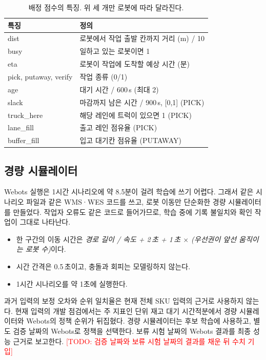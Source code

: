 \documentclass[conference]{IEEEtran}
\newcommand{\todo}[1]{\textcolor{red}{[TODO: #1]}}
\begin{document}
\begin{table}[t]
\centering
\caption{배정 점수의 특징. 위 세 개만 로봇에 따라 달라진다.} %
\label{tab:features}
\small
\begin{tabular}{@{}lp{}@{}}
\toprule
특징 & 정의 \\
\midrule
dist & 로봇에서 작업 출발 칸까지 거리 (m) / 10 \\
busy & 일하고 있는 로봇이면 1 \\
eta & 로봇이 작업에 도착할 예상 시간 (분) \\
\midrule
pick, putaway, verify & 작업 종류 (0/1) \\
age & 대기 시간 / 600\,s (최대 2) \\
slack & 마감까지 남은 시간 / 900\,s, [0,1] (PICK) \\
truck\_here & 해당 레인에 트럭이 있으면 1 (PICK) \\
lane\_fill & 출고 레인 점유율 (PICK) \\
buffer\_fill & 입고 대기칸 점유율 (PUTAWAY) \\
\bottomrule
\end{tabular}
\end{table}

\subsection{경량 시뮬레이터}
Webots 실행은 1시간 시나리오에 약 8.5분이 걸려 학습에 쓰기 어렵다.
그래서 같은 시나리오 파일과 같은 WMS·WES 코드를 쓰고, 로봇 이동만 단순화한 경량 시뮬레이터를 만들었다.
작업자 오류도 같은 코드로 들어가므로, 학습 중에 기록 불일치와 확인 작업이 그대로 나타난다.
\begin{itemize}
  \item 한 구간의 이동 시간은 \emph{경로 길이 / 속도 + 2\,초 + 1\,초 $\times$ (우선권이 앞선 움직이는 로봇 수)}이다.
  \item 시간 간격은 0.5\,초이고, 충돌과 회피는 모델링하지 않는다.
  \item 1시간 시나리오를 약 1초에 실행한다.
\end{itemize}
과거 입력의 보정 오차와 순위 일치율은 현재 전체 SKU 입력의 근거로 사용하지 않는다.
현재 입력의 개발 점검에서는 주 지표인 단위 재고 대기 시간적분에서 경량 시뮬레이터와 Webots의 정책 순위가 뒤집혔다.
경량 시뮬레이터는 후보 학습에 사용하고, 별도 검증 날짜의 Webots로 정책을 선택한다.
보류 시험 날짜의 Webots 결과를 최종 성능 근거로 보고한다.
\todo{검증 날짜와 보류 시험 날짜의 결과를 채운 뒤 수치 기입}
\end{document}
